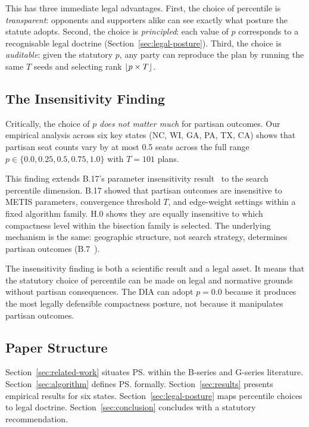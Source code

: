 This has three immediate legal advantages.
First, the choice of percentile is \emph{transparent}: opponents and
supporters alike can see exactly what posture the statute adopts.
Second, the choice is \emph{principled}: each value of $p$ corresponds to
a recognisable legal doctrine (Section~\ref{sec:legal-posture}).
Third, the choice is \emph{auditable}: given the statutory $p$, any party
can reproduce the plan by running the same $T$ seeds and selecting rank
$\lfloor p \times T \rfloor$.

\subsection{The Insensitivity Finding}

Critically, the choice of $p$ \emph{does not matter much} for partisan
outcomes.
Our empirical analysis across six key states (NC, WI, GA, PA, TX, CA) shows
that partisan seat counts vary by at most 0.5 seats across the full range
$p \in \{0.0, 0.25, 0.5, 0.75, 1.0\}$ with $T = 101$ plans.

This finding extends B.17's parameter insensitivity result~\citep{b17paper}
to the search percentile dimension.
B.17 showed that partisan outcomes are insensitive to METIS parameters,
convergence threshold $T$, and edge-weight settings within a fixed algorithm
family.
H.0 shows they are equally insensitive to which compactness level within
the bisection family is selected.
The underlying mechanism is the same: geographic structure, not search
strategy, determines partisan outcomes (B.7~\citep{b7paper}).

The insensitivity finding is both a scientific result and a legal asset.
It means that the statutory choice of percentile can be made on legal and
normative grounds without partisan consequences.
The DIA can adopt $p = 0.0$ because it produces the most legally defensible
compactness posture, not because it manipulates partisan outcomes.

\subsection{Paper Structure}

Section~\ref{sec:related-work} situates \ps{} within the B-series
and G-series literature.
Section~\ref{sec:algorithm} defines \ps{} formally.
Section~\ref{sec:results} presents empirical results for six states.
Section~\ref{sec:legal-posture} maps percentile choices to legal doctrine.
Section~\ref{sec:conclusion} concludes with a statutory recommendation.
